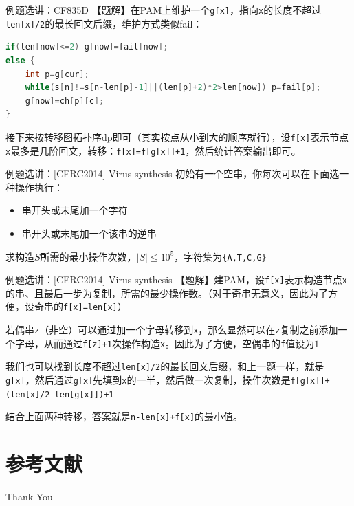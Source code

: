 \documentclass{beamer}
\begin{document}
\begin{frame}[fragile]{例题选讲：CF835D}
\small
【题解】在PAM上维护一个\verb|g[x]|，指向\verb|x|的长度不超过\verb|len[x]/2|的最长回文后缀，维护方式类似fail：
\begin{lstlisting}[language=c++]
if(len[now]<=2) g[now]=fail[now];
else {
    int p=g[cur];
    while(s[n]!=s[n-len[p]-1]||(len[p]+2)*2>len[now]) p=fail[p];
    g[now]=ch[p][c];
}
\end{lstlisting}

\vspace{1em}\pause
接下来按转移图拓扑序dp即可（其实按点从小到大的顺序就行），设\verb|f[x]|表示节点\verb|x|最多是几阶回文，转移：\verb|f[x]=f[g[x]]+1|，然后统计答案输出即可。
\end{frame}

\begin{frame}[fragile]{例题选讲：[CERC2014] Virus synthesis}
\small
初始有一个空串，你每次可以在下面选一种操作执行：
\begin{itemize}
    \item 串开头或末尾加一个字符
    \item 串开头或末尾加一个该串的逆串
\end{itemize}

求构造$S$所需的最小操作次数，$|S|\leq 10^5$，字符集为\verb|{A,T,C,G}|
\end{frame}

\begin{frame}[fragile]{例题选讲：[CERC2014] Virus synthesis}
\small
【题解】建PAM，设\verb|f[x]|表示构造节点\verb|x|的串、且最后一步为复制，所需的最少操作数。（对于奇串无意义，因此为了方便，设奇串的\verb|f[x]=len[x]|）

\vspace{1em}\pause
若偶串\verb|z|（非空）可以通过加一个字母转移到\verb|x|，那么显然可以在\verb|z|复制之前添加一个字母，从而通过\verb|f[z]+1|次操作构造\verb|x|。因此为了方便，空偶串的\verb|f|值设为$1$

\vspace{1em}\pause
我们也可以找到长度不超过\verb|len[x]/2|的最长回文后缀，和上一题一样，就是\verb|g[x]|，然后通过\verb|g[x]|先填到\verb|x|的一半，然后做一次复制，操作次数是\verb|f[g[x]]+(len[x]/2-len[g[x]])+1|

\vspace{1em}\pause
结合上面两种转移，答案就是\verb|n-len[x]+f[x]|的最小值。
\end{frame}

\section{参考文献}

\begin{frame}[allowframebreaks]
    
    
    \nocite{*} %
\end{frame}


\begin{frame}
    \begin{center}
        {\Huge\calligra Thank You}
    \end{center}
\end{frame}
\end{document}
